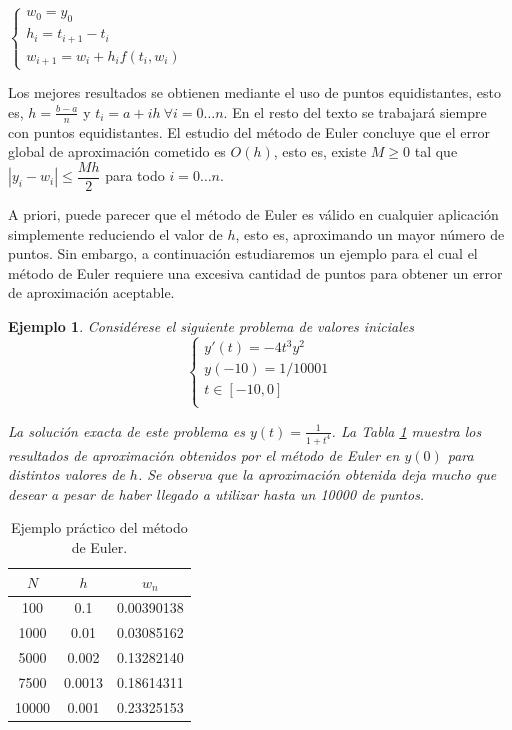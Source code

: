 \documentclass{article}
\theoremstyle{theorem-style}  %
\theoremstyle{definition-style}
\theoremstyle{example-style}
\newtheorem{example}{Ejemplo}[section]
\begin{document}
	\begin{center}
		$\begin{cases}
		w_0=y_0 \\
		h_{i} = t_{i+1} - t_i \\
		w_{i+1} = w_i + h_{i} f(t_i,w_i)
		\end{cases}$
	\end{center}
	
	Los mejores resultados se obtienen mediante el uso de puntos equidistantes, esto es, $h = \frac{b-a}{n}$ y $t_i = a + ih \ \forall i = 0 \ldots n$. En el resto del texto se trabajará siempre con puntos equidistantes. El estudio del método de Euler concluye que el error global de aproximación cometido es $O(h)$, esto es, existe $M \ge 0$ tal que $\left|y_i - w_i\right| \le\dfrac{Mh}{2}$ para todo $i=0 \ldots n$.
				
	A priori, puede parecer que el método de Euler es válido en cualquier aplicación simplemente reduciendo el valor de $h$, esto es, aproximando un mayor número de puntos. Sin embargo, a continuación estudiaremos un ejemplo para el cual el método de Euler requiere una excesiva cantidad de puntos para obtener un error de aproximación aceptable. 
	
	\begin{example} Considérese el siguiente problema de valores iniciales
		\begin{equation*}
			\begin{cases}
			y'(t) = -4 t^3 y^2 \\
			y(-10) = 1/10001 \\
			t \in [-10,0] \\
			\end{cases}
		\end{equation*}

		La solución exacta de este problema es $y(t)=\frac{1}{1+t^4}$. La Tabla \ref{table:euler} muestra los resultados de aproximación obtenidos por el método de Euler en $y(0)$ para distintos valores de $h$. Se observa que la aproximación obtenida deja mucho que desear a pesar de haber llegado a utilizar hasta un 10000 de puntos. 
	\end{example}
	
	\begin{table}[H]
		\centering
		\begin{tabular}{|| c | c | c ||}
			\hline
			\hline $N$ &  $h$ & $w_n$ \\
			\hline 100 & 0.1 & 0.00390138 \\
			\hline 1000 & 0.01 & 0.03085162 \\
			\hline 5000 & 0.002 & 0.13282140 \\
			\hline 7500 & 0.0013 & 0.18614311 \\
			\hline 10000 & 0.001 & 0.23325153 \\			
		\end{tabular}
		\caption{Ejemplo práctico del método de Euler.}
		\label{table:euler}
	\end{table}
	
\end{document}
